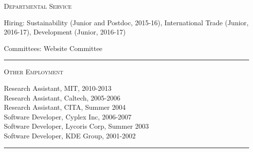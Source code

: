 \documentclass{article}
\begin{document}
\parbox{\textwidth}{
\parbox[t]{0.28\textwidth}{ \raggedright \noindent \textsc{ Departmental Service } }
\parbox[t]{0.72\textwidth}{ \raggedright

Hiring: Sustainability (Junior and Postdoc, 2015-16), International Trade (Junior, 2016-17), Development (Junior, 2016-17)
\vspace{0.27cm}

Committees: Website Committee
\vspace{0.27cm}

}
\textcolor{light-gray}{\hrule}
}
\vspace{0.3cm}

\parbox{\textwidth}{
\parbox[t]{0.28\textwidth}{ \raggedright \noindent \textsc{ Other Employment } }
\parbox[t]{0.72\textwidth}{ \raggedright

Research Assistant, MIT, 2010-2013 \\
Research Assistant, Caltech, 2005-2006 \\
Research Assistant, CITA, Summer 2004 \\
Software Developer, Cyplex Inc, 2006-2007 \\
Software Developer, Lycoris Corp, Summer 2003 \\
Software Developer, KDE Group, 2001-2002
\vspace{0.27cm}

}
\textcolor{light-gray}{\hrule}
}
\vspace{0.3cm}
\end{document}

